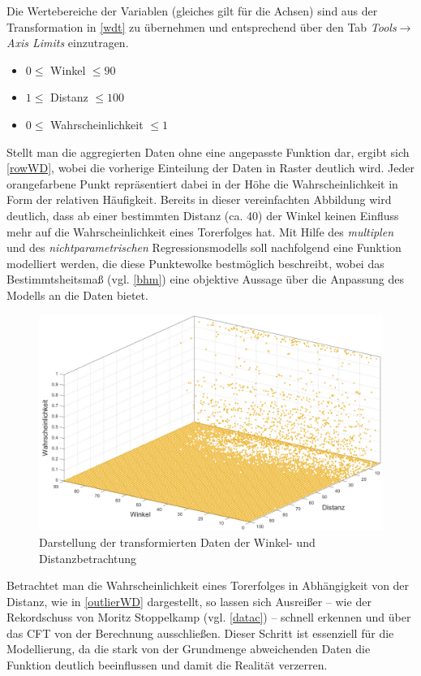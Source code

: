 Die Wertebereiche der Variablen (gleiches gilt für die Achsen) sind aus der Transformation in \vref{wdt} zu übernehmen und entsprechend über den Tab \textit{Tools}$\rightarrow$\textit{Axis Limits} einzutragen.

\begin{itemize}
\item $ 0 \le$ Winkel $\le 90$
\item $ 1 \le$ Distanz $\le 100$
\item $ 0 \le$ Wahrscheinlichkeit $\le 1$
\end{itemize}

Stellt man die aggregierten Daten ohne eine angepasste Funktion dar, ergibt sich \vref{rowWD}, wobei die vorherige Einteilung der Daten in Raster deutlich wird. Jeder orangefarbene Punkt repräsentiert dabei in der Höhe die Wahrscheinlichkeit in Form der relativen Häufigkeit. Bereits in dieser vereinfachten Abbildung wird deutlich, dass ab einer bestimmten Distanz (ca. \textsf{40}) der Winkel keinen Einfluss mehr auf die Wahrscheinlichkeit eines Torerfolges hat. Mit Hilfe des \textit{multiplen} und des \textit{nichtparametrischen} Regressionsmodells soll nachfolgend eine Funktion modelliert werden, die diese Punktewolke bestmöglich beschreibt, wobei das Bestimmtsheitsmaß (vgl. \vref{bhm}) eine objektive Aussage über die Anpassung des Modells an die Daten bietet.

\begin{figure}[H]
\centering
\includegraphics[scale=0.345]{se-wa-jpg/rowWD}
\caption{Darstellung der transformierten Daten der Winkel- und Distanzbetrachtung}
\label{rowWD}
\end{figure}

Betrachtet man die Wahrscheinlichkeit eines Torerfolges in Abhängigkeit von der Distanz, wie in \vref{outlierWD} dargestellt, so lassen sich Ausreißer -- wie der Rekordschuss von Moritz Stoppelkamp (vgl. \vref{datac}) -- schnell erkennen und über das CFT von der Berechnung ausschließen. Dieser Schritt ist essenziell für die Modellierung, da die stark von der Grundmenge abweichenden Daten die Funktion deutlich beeinflussen und damit die Realität verzerren.

